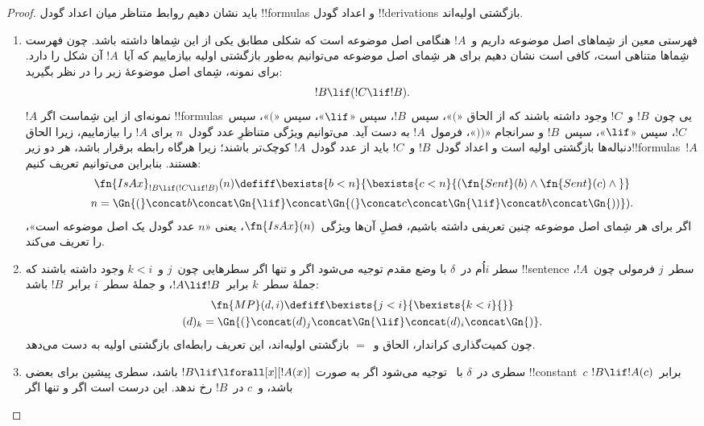 \documentclass[../../../include/open-logic-section]{subfiles}
\begin{document}
\begin{proof}
باید نشان دهیم روابط متناظر میان اعداد گودل !!{formula}s و اعداد
گودل !!{derivation}s بازگشتی اولیه‌اند.
\begin{enumerate}
\item فهرستی معین از شِماهای اصل موضوعه داریم و~$!A$ هنگامی اصل
  موضوعه است که شکلی مطابق یکی از این شِماها داشته باشد. چون فهرست
  شِماها متناهی است، کافی است نشان دهیم برای هر شِمای اصل موضوعه
  می‌توانیم به‌طور بازگشتی اولیه بیازماییم که آیا~$!A$ آن شکل را
  دارد. برای نمونه، شِمای اصل موضوعهٔ زیر را در نظر بگیرید:
  \[
  !B \lif (!C \lif !B).
  \]
  $!A$ نمونه‌ای از این شِماست اگر !!{formula}sیی چون~$!B$ و~$!C$
  وجود داشته باشند که از الحاق «$($»، سپس~$!B$، سپس «$\lif$»، سپس
  «$($»، سپس~$!C$، سپس «$\lif$»، سپس~$!B$ و سرانجام «$))$»،
  فرمول~$!A$ به دست آید. می‌توانیم ویژگی متناظرِ عدد گودل~$n$ برای
  $!A$ را بیازماییم، زیرا الحاق دنباله‌ها بازگشتی اولیه است و اعداد
  گودل~$!B$ و~$!C$ باید از عدد گودل~$!A$ کوچک‌تر باشند؛ زیرا هرگاه
  رابطه برقرار باشد، هر دو زیر!!{formula}s~$!A$ هستند. بنابراین می‌توانیم
  تعریف کنیم:
  \begin{multline*}
  \fn{IsAx}_{!B \lif (!C \lif !B)}(n) \defiff \bexists{b< n}{
    \bexists{c < n}{(\fn{Sent}(b) \land \fn{Sent}(c) \land {}}}\\ n =
  \Gn{(} \concat b \concat \Gn{\lif} \concat \Gn{(} \concat c \concat
  \Gn{\lif} \concat b \concat \Gn{))}).
  \end{multline*}
  اگر برای هر شِمای اصل موضوعه چنین تعریفی داشته باشیم، فصلِ
  آن‌ها ویژگی~$\fn{IsAx}(n)$، یعنی «$n$ عدد گودل یک اصل موضوعه
  است»، را تعریف می‌کند.
\item سطر $i$اُم در~$\delta$ با وضع مقدم توجیه می‌شود اگر و تنها اگر
  سطرهایی چون~$j$ و~$k<i$ وجود داشته باشند که !!{sentence}ٔ سطر~$j$
  فرمولی چون~$!A$، جملهٔ سطر~$k$ برابر~$!A\lif !B$، و جملهٔ
  سطر~$i$ برابر~$!B$ باشد:
  \begin{multline*}
    \fn{MP}(d, i) \defiff \bexists{j < i}{\bexists{k < i}{}}\\
    (d)_k = \Gn{(} \concat (d)_j
      \concat \Gn{\lif} \concat (d)_i \concat \Gn{)}.
  \end{multline*}
  چون کمیت‌گذاری کراندار، الحاق و~$=$ بازگشتی اولیه‌اند، این تعریف
  رابطه‌ای بازگشتی اولیه به دست می‌دهد.
\item سطری در~$\delta$ با~\QR{} توجیه می‌شود اگر به صورت
  $!B\lif\lforall[x][!A(x)]$ باشد، سطری پیشین برای بعضی !!{constant}~$c$
  برابر~$!B\lif !A(c)$ باشد، و~$c$ در~$!B$ رخ ندهد. این درست است اگر
  و تنها اگر
  \begin{enumerate}

\end{enumerate}
\end{enumerate}
\end{proof}
\end{document}
